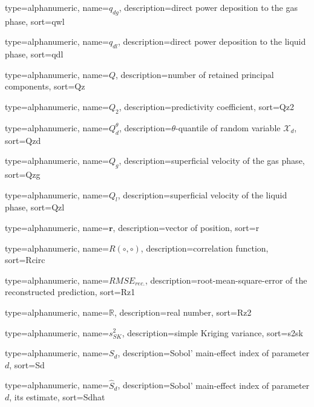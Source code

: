 {
  type=alphanumeric,
	name={\ensuremath{q_{dg}}},
	description={direct power deposition to the gas phase},
	sort={qwl}
}

{
  type=alphanumeric,
	name={\ensuremath{q_{dl}}},
	description={direct power deposition to the liquid phase},
	sort={qdl}
}

{
  type=alphanumeric,
	name={\ensuremath{Q}},
	description={number of retained principal components},
	sort={Qz}
}

{
  type=alphanumeric,
	name={\ensuremath{Q_{2}}},
	description={predictivity coefficient},
	sort={Qz2}
}

{
  type=alphanumeric,
	name={\ensuremath{Q_{d}^\theta}},
	description={$\theta$-quantile of random variable $\mathcal{X}_d$},
	sort={Qzd}
}

{
  type=alphanumeric,
	name={\ensuremath{Q_{g}}},
	description={superficial velocity of the gas phase},
	sort={Qzg}
}

{
  type=alphanumeric,
	name={\ensuremath{Q_{l}}},
	description={superficial velocity of the liquid phase},
	sort={Qzl}
}

{
  type=alphanumeric,
	name={\ensuremath{\mathbf{r}}},
	description={vector of position},
	sort={r}
}

{
  type=alphanumeric,
	name={\ensuremath{R (\circ, \circ)}},
	description={correlation function},
	sort={Rcirc}
}

{
  type=alphanumeric,
	name={\ensuremath{RMSE_{rec.}}},
	description={root-mean-square-error of the reconstructed prediction},
	sort={Rz1}
}

{
  type=alphanumeric,
	name={\ensuremath{\mathbb{R}}},
	description={real number},
	sort={Rz2}
}

{
  type=alphanumeric,
	name={\ensuremath{s^2_{SK}}},
	description={simple Kriging variance},
	sort={s2sk}
}

{
  type=alphanumeric,
	name={\ensuremath{S_d}},
	description={Sobol' main-effect index of parameter $d$},
	sort={Sd}
}

{
  type=alphanumeric,
	name={\ensuremath{\widehat{S}_d}},
	description={Sobol' main-effect index of parameter $d$, its estimate},
	sort={Sdhat}
}

